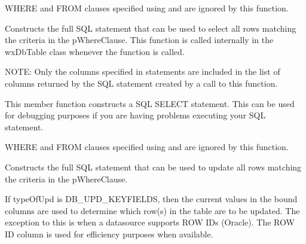 WHERE and FROM clauses specified using  
and  are ignored by 
this function.


\label{wxdbtablebuildselectstmt}


Constructs the full SQL statement that can be used to select all rows matching
the criteria in the pWhereClause.  This function is called internally in the 
wxDbTable class whenever the function  
is called.

NOTE: Only the columns specified in  
statements are included in the list of columns returned by the SQL statement 
created by a call to this function.




This member function constructs a SQL SELECT statement.  This can be used for 
debugging purposes if you are having problems executing your SQL statement.

WHERE and FROM clauses specified using 
and  are ignored by 
this function.


\label{wxdbtablebuildupdatestmt}


Constructs the full SQL statement that can be used to update all rows matching
the criteria in the pWhereClause.

If typeOfUpd is DB\_UPD\_KEYFIELDS, then the current values in the bound columns
are used to determine which row(s) in the table are to be updated. The 
exception to this is when a datasource supports ROW IDs (Oracle).  The ROW ID
column is used for efficiency purposes when available.

